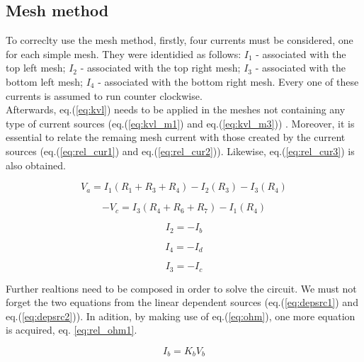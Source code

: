 \subsection{Mesh method}
\label{subsec:mesh_met}

To correclty use the mesh method, firstly, four currents must be considered, one for each simple mesh.
They were identidied as follows: $I_1$ - associated with the top left mesh; $I_2$ - associated with
the top right mesh; $I_3$ - associated with the bottom left mesh; $I_4$ - associated with the bottom
right mesh. Every one of these currents is assumed to run counter clockwise. \\

Afterwards, eq.(\ref{eq:kvl}) needs to be applied in the meshes not containing any type of current
sources (eq.(\ref{eq:kvl_m1}) and eq.(\ref{eq:kvl_m3})) . Moreover, it is essential to relate the
remaing mesh current with those created by the current sources (eq.(\ref{eq:rel_cur1}) and
eq.(\ref{eq:rel_cur2})). Likewise, eq.(\ref{eq:rel_cur3}) is also obtained.

\begin{equation}
	V_a = I_1(R_1+R_3+R_4)-I_2(R_3)-I_3(R_4)
	\label{eq:kvl_m1}
\end{equation}

\begin{equation}
	-V_c = I_3(R_4+R_6+R_7)-I_1(R_4)
	\label{eq:kvl_m3}
\end{equation}

\begin{equation}
	I_2 = -I_b
	\label{eq:rel_cur1}
\end{equation}

\begin{equation}
	I_4 = -I_d
	\label{eq:rel_cur2}
\end{equation}

\begin{equation}
	I_3 = -I_c
	\label{eq:rel_cur3}
\end{equation}

Further realtions need to be composed in order to solve the circuit. We must not forget the two equations
from the linear dependent sources (eq.(\ref{eq:depsrc1}) and eq.(\ref{eq:depsrc2})). In adition, by
making use of eq.(\ref{eq:ohm}), one more equation is acquired, eq. \ref{eq:rel_ohm1}.

\begin{equation}
	I_b = K_bV_b
	\label{eq:depsrc1}
\end{equation}

